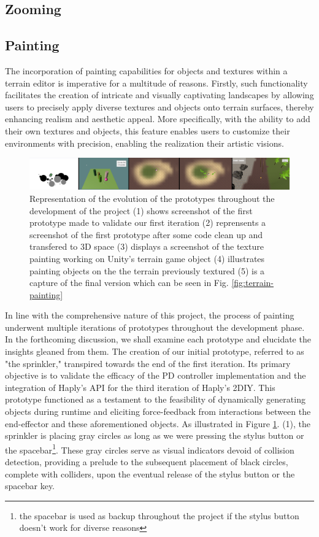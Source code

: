 \subsection{Zooming}

\subsection{Painting}
The incorporation of painting capabilities for objects and textures within a terrain editor is imperative for a multitude of reasons. 
Firstly, such functionality facilitates the creation of intricate and visually captivating landscapes by allowing users to precisely apply diverse textures and objects onto terrain surfaces, thereby enhancing realism and aesthetic appeal. 
More specifically, with the ability to add their own textures and objects, this feature enables users to customize their environments with precision, enabling the realization their artistic visions. 

\begin{figure}[htbp]
    \centering
    \includegraphics[width=1.0\textwidth]{images/timeline.png} 
    \caption{Representation of the evolution of the prototypes throughout the development of the project
    (1) shows screenshot of the first prototype made to validate our first iteration
    (2) reprensents a screenshot of the first prototype after some code clean up and transfered to 3D space
    (3) displays a screenshot of the texture painting working on Unity's terrain game object
    (4) illustrates painting objects on the the terrain previously textured
    (5) is a capture of the final version which can be seen in Fig. \ref{fig:terrain-painting}}
    \label{fig:texture-rendering}
\end{figure}

In line with the comprehensive nature of this project, the process of painting underwent multiple iterations of prototypes throughout the development phase. 
In the forthcoming discussion, we shall examine each prototype and elucidate the insights gleaned from them. 
The creation of our initial prototype, referred to as "the sprinkler," transpired towards the end of the first iteration. 
Its primary objective is to validate the efficacy of the PD controller implementation and the integration of Haply's API for the third iteration of Haply's 2DIY. 
This prototype functioned as a testament to the feasibility of dynamically generating objects during runtime and eliciting force-feedback from interactions between the end-effector and these aforementioned objects.
As illustrated in Figure \ref{fig:texture-rendering}. (1), the sprinkler is placing gray circles as long as we were pressing the stylus button or the spacebar\footnote{the spacebar is used as backup throughout the project if the stylus button doesn't work for diverse reasons}.
These gray circles serve as visual indicators devoid of collision detection, providing a prelude to the subsequent placement of black circles, complete with colliders, upon the eventual release of the stylus button or the spacebar key.


